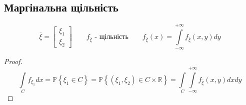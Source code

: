\documentclass[fontsize=14pt,a4paper]{scrartcl}
\theoremstyle{definition}
\theoremstyle{remark}
\theoremstyle{definition}
\theoremstyle{definition}
\begin{document}
\subsection{Маргінальна щільність}
$$
\overline{\xi}  = \begin{bmatrix}
  \xi_1 \\ \xi_2
\end{bmatrix}
\qquad f_{ \overline{ \xi}} \text{ - щільність} \qquad f_{ \overline{ \xi}} (x) =  \int\limits_{- \infty}^{ +\infty}{ f_{ \overline{\xi}}(x,y)dy}
$$

\begin{proof}
$$ \int\limits_{C}^{}{f_{ \xi_1} dx}=
\mathbb{P} \left\lbrace \xi_1 \in C \right\rbrace = \mathbb{P} \left\lbrace ( \xi_1 , \xi_2 ) \in C \times \mathbb{R} \right\rbrace =  \int\limits_{C}^{}{   \int\limits_{-\infty}^{ +\infty}{ f_{ \overline{\xi}}(x,y) dxdy}}$$
\end{proof}
\end{document}
